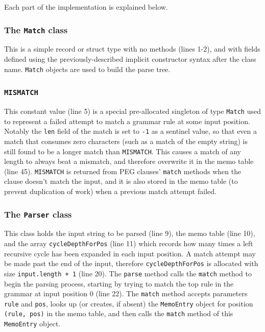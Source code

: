\documentclass[manuscript]{acmart}
\begin{document}
Each part of the implementation is explained below.

\subsubsection{The \texttt{Match} class} This is a simple record or struct type with no methods (lines 1-2), and with fields defined using the previously-described implicit constructor syntax after the class name. \texttt{Match} objects are used to build the parse tree.

\subsubsection{\texttt{MISMATCH}} This constant value (line 5) is a special pre-allocated singleton of type \texttt{Match} used to represent a failed attempt to match a grammar rule at some input position. Notably the \texttt{len} field of the match is set to \texttt{-1} as a sentinel value, so that even a match that consumes zero characters (such as a match of the empty string) is still found to be a longer match than \texttt{MISMATCH}. This causes a match of any length to always beat a mismatch, and therefore overwrite it in the memo table (line 45). \texttt{MISMATCH} is returned from PEG clauses' \texttt{match} methods when the clause doesn't match the input, and it is also stored in the memo table (to prevent duplication of work) when a previous match attempt failed.

\subsubsection{The \texttt{Parser} class} This class holds the input string to be parsed (line 9), the memo table (line 10), and the array \texttt{cycleDepthForPos} (line 11) which records how many times a left recursive cycle has been expanded in each input position. A match attempt may be made past the end of the input, therefore \texttt{cycleDepthForPos} is allocated with size \texttt{input.length + 1} (line 20). The \texttt{parse} method calls the \texttt{match} method to begin the parsing process, starting by trying to match the top rule in the grammar at input position 0 (line 22). The \texttt{match} method accepts parameters \texttt{rule} and \texttt{pos}, looks up (or creates, if absent) the \texttt{MemoEntry} object for position \texttt{(rule, pos)} in the memo table, and then calls the \texttt{match} method of this \texttt{MemoEntry} object.
\end{document}
